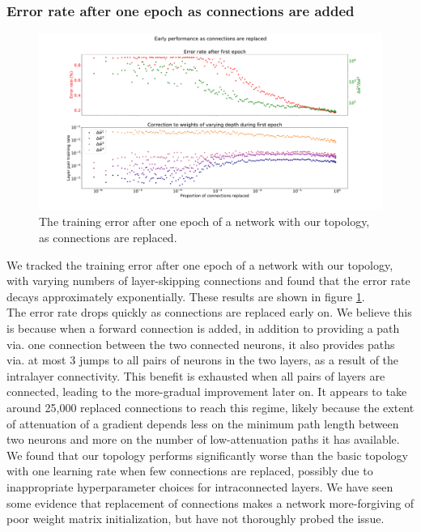 \documentclass{article}
\newcommand{\npar}{\\\indent}
\begin{document}
\subsubsection{Error rate after one epoch as connections are added}
\label{sec:mnist_1epoch}

\begin{figure}
  \centering
  \includegraphics[width=\textwidth]{figures/MNIST_one_epoch_performance.pdf}
  \caption{The training error after one epoch of a network with our topology, as connections are replaced.}
  \label{fig:mnist_1epoch}
\end{figure}

We tracked the training error after one epoch of a network with our topology, with varying numbers of layer-skipping connections and found that the error rate decays approximately exponentially. These results are shown in figure \ref{fig:mnist_1epoch}.
\npar
The error rate drops quickly as connections are replaced early on. We believe this is because when a forward connection is added, in addition to providing a path via. one connection between the two connected neurons, it also provides paths via. at most 3 jumps to all pairs of neurons in the two layers, as a result of the intralayer connectivity. This benefit is exhausted when all pairs of layers are connected, leading to the more-gradual improvement later on. It appears to take around 25,000 replaced connections to reach this regime, likely because the extent of attenuation of a gradient depends less on the minimum path length between two neurons and more on the number of low-attenuation paths it has available.
\npar
We found that our topology performs significantly worse than the basic topology with one learning rate when few connections are replaced, possibly due to inappropriate hyperparameter choices for intraconnected layers. We have seen some evidence that replacement of connections makes a network more-forgiving of poor weight matrix initialization, but have not thoroughly probed the issue.
\end{document}
